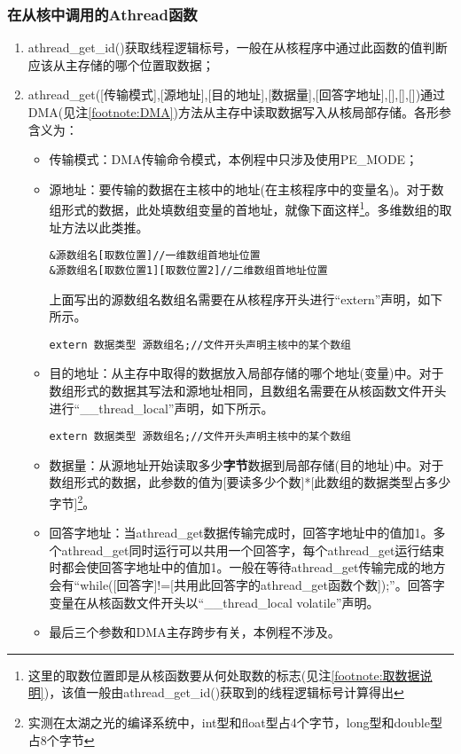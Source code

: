 \subsubsection{在从核中调用的Athread函数}
\begin{enumerate}
	\item athread\_get\_id()获取线程逻辑标号，一般在从核程序中通过此函数的值判断应该从主存储的哪个位置取数据；
	\item athread\_get([传输模式],[源地址],[目的地址],[数据量],[回答字地址],[],[],[])通过DMA(见注\ref{footnote:DMA})方法从主存中读取数据写入从核局部存储。各形参含义为：
	      \begin{itemize}
		      \item 传输模式：DMA传输命令模式，本例程中只涉及使用PE\_MODE；
		      \item 源地址：要传输的数据在主核中的地址(在主核程序中的变量名)。对于数组形式的数据，此处填数组变量的首地址，就像下面这样\footnote{这里的取数位置即是从核函数要从何处取数的标志(见注\ref{footnote:取数据说明})，该值一般由athread\_get\_id()获取到的线程逻辑标号计算得出}。多维数组的取址方法以此类推。
		            \begin{lstlisting}
&源数组名[取数位置]//一维数组首地址位置
&源数组名[取数位置1][取数位置2]//二维数组首地址位置
        \end{lstlisting}
		            上面写出的源数组名数组名需要在从核程序开头进行“extern”声明，如下所示。
		            \begin{lstlisting}
extern 数据类型 源数组名;//文件开头声明主核中的某个数组
		\end{lstlisting}
		      \item 目的地址：从主存中取得的数据放入局部存储的哪个地址(变量)中。对于数组形式的数据其写法和源地址相同，且数组名需要在从核函数文件开头进行“\_\_thread\_local”声明，如下所示。
		            \begin{lstlisting}
extern 数据类型 源数组名;//文件开头声明主核中的某个数组
		\end{lstlisting}
		      \item 数据量：从源地址开始读取多少\textbf{字节}数据到局部存储(目的地址)中。对于数组形式的数据，此参数的值为[要读多少个数]*[此数组的数据类型占多少字节]\footnote{实测在太湖之光的编译系统中，int型和float型占4个字节，long型和double型占8个字节}。
		      \item 回答字地址：当athread\_get数据传输完成时，回答字地址中的值加1。多个athread\_get同时运行可以共用一个回答字，每个athread\_get运行结束时都会使回答字地址中的值加1。一般在等待athread\_get传输完成的地方会有“while([回答字]!=[共用此回答字的athread\_get函数个数]);”。回答字变量在从核函数文件开头以“\_\_thread\_local volatile”声明。
		      \item 最后三个参数和DMA主存跨步有关，本例程不涉及。
	      \end{itemize}
\end{enumerate}



